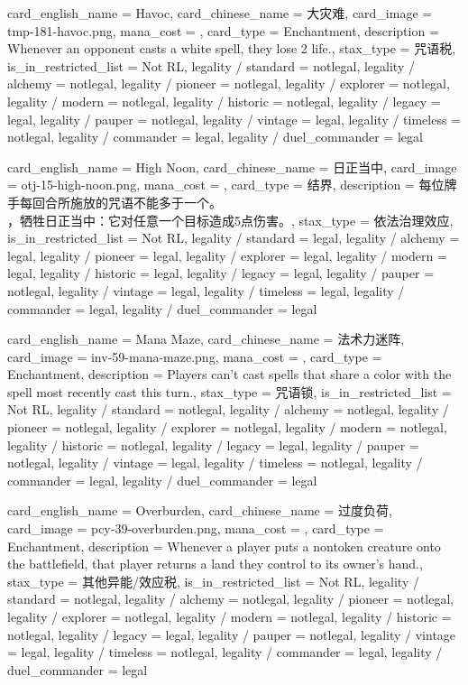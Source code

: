 \documentclass[lang = cn, color = black, 10pt]{AllThatStax}
\begin{document}
\card
{
	card_english_name = {Havoc},
	card_chinese_name = {大灾难},
	card_image = tmp-181-havoc.png,
	mana_cost = ,
	card_type = Enchantment,
	description = {Whenever an opponent casts a white spell, they lose 2 life.},
	stax_type = 咒语税,
	is_in_restricted_list = Not RL,
	legality / standard = notlegal,
	legality / alchemy = notlegal,
	legality / pioneer = notlegal,
	legality / explorer = notlegal,
	legality / modern = notlegal,
	legality / historic = notlegal,
	legality / legacy = legal,
	legality / pauper = notlegal,
	legality / vintage = legal,
	legality / timeless = notlegal,
	legality / commander = legal,
	legality / duel_commander = legal
}

\card
{
	card_english_name = {High Noon},
	card_chinese_name = {日正当中},
	card_image = otj-15-high-noon.png,
	mana_cost = ,
	card_type = 结界,
	description = {每位牌手每回合所施放的咒语不能多于一个。\\
		，牺牲日正当中：它对任意一个目标造成5点伤害。},
	stax_type = 依法治理效应,
	is_in_restricted_list = Not RL,
	legality / standard = legal,
	legality / alchemy = legal,
	legality / pioneer = legal,
	legality / explorer = legal,
	legality / modern = legal,
	legality / historic = legal,
	legality / legacy = legal,
	legality / pauper = notlegal,
	legality / vintage = legal,
	legality / timeless = legal,
	legality / commander = legal,
	legality / duel_commander = legal
}

\card
{
	card_english_name = {Mana Maze},
	card_chinese_name = {法术力迷阵},
	card_image = inv-59-mana-maze.png,
	mana_cost = ,
	card_type = Enchantment,
	description = {Players can't cast spells that share a color with the spell most recently cast this turn.},
	stax_type = 咒语锁,
	is_in_restricted_list = Not RL,
	legality / standard = notlegal,
	legality / alchemy = notlegal,
	legality / pioneer = notlegal,
	legality / explorer = notlegal,
	legality / modern = notlegal,
	legality / historic = notlegal,
	legality / legacy = legal,
	legality / pauper = notlegal,
	legality / vintage = legal,
	legality / timeless = notlegal,
	legality / commander = legal,
	legality / duel_commander = legal
}

\card
{
	card_english_name = {Overburden},
	card_chinese_name = {过度负荷},
	card_image = pcy-39-overburden.png,
	mana_cost = ,
	card_type = Enchantment,
	description = {Whenever a player puts a nontoken creature onto the battlefield, that player returns a land they control to its owner's hand.},
	stax_type = 其他异能/效应税,
	is_in_restricted_list = Not RL,
	legality / standard = notlegal,
	legality / alchemy = notlegal,
	legality / pioneer = notlegal,
	legality / explorer = notlegal,
	legality / modern = notlegal,
	legality / historic = notlegal,
	legality / legacy = legal,
	legality / pauper = notlegal,
	legality / vintage = legal,
	legality / timeless = notlegal,
	legality / commander = legal,
	legality / duel_commander = legal
}
\end{document}
